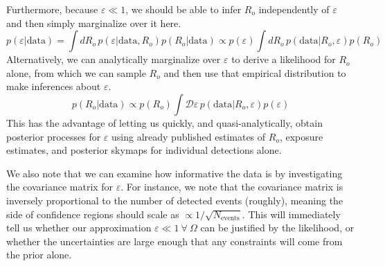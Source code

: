 \documentclass{article}
\begin{document}
Furthermore, because $\varepsilon\ll1$, we should be able to infer $R_o$ independently of $\varepsilon$ and then simply marginalize over it here.
\begin{equation}
    p(\varepsilon|\mathrm{data}) = \int dR_o\, p(\varepsilon|\mathrm{data},R_o)p(R_o|\mathrm{data}) \propto p(\varepsilon) \int dR_o\, p(\mathrm{data}|R_o, \varepsilon)p(R_o)
\end{equation}
Alternatively, we can analytically marginalize over $\varepsilon$ to derive a likelihood for $R_o$ alone, from which we can sample $R_o$ and then use that empirical distribution to make inferences about $\varepsilon$.
\begin{equation}
    p(R_o|\mathrm{data}) \propto p(R_o) \int \mathcal{D}\varepsilon\, p(\mathrm{data}|R_o, \varepsilon)p(\varepsilon)
\end{equation}
This has the advantage of letting us quickly, and quasi-analytically, obtain posterior processes for $\varepsilon$ using already published estimates of $R_o$, exposure estimates, and posterior skymaps for individual detections alone. 

We also note that we can examine how informative the data is by investigating the covariance matrix for $\varepsilon$.
For instance, we note that the covariance matrix is inversely proportional to the number of detected events (roughly), meaning the side of confidence regions should scale as $\propto 1/\sqrt{N_\mathrm{events}}$.
This will immediately tell us whether our approximation $\varepsilon\ll1\ \forall\ \Omega$ can be justified by the likelihood, or whether the uncertainties are large enough that any constraints will come from the prior alone.

\end{document}
